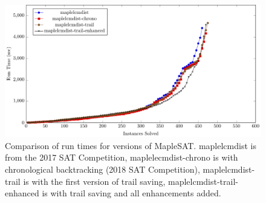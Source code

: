 \documentclass{article}
\begin{document}
\begin{figure}\includegraphics[scale=0.8]{cactus_maple2.pdf}\caption{\small{Comparison of run times for versions of MapleSAT. maplelcmdist is from the 2017 SAT Competition, maplelecmdist-chrono is with chronological backtracking (2018 SAT Competition), maplelcmdist-trail is with the first version of trail saving, maplelcmdist-trail-enhanced is with trail saving and all enhancements added.}}\end{figure}

\clearpage
\end{document}
